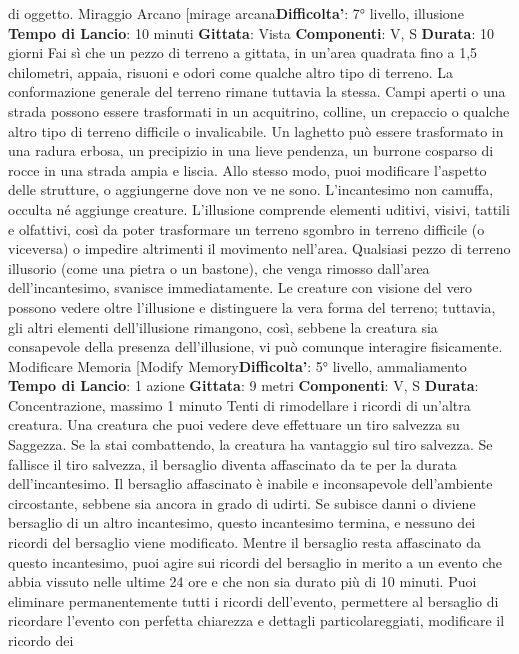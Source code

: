 \begin{multicols}{2}
di oggetto.
Miraggio Arcano
[mirage arcana\textbf{Difficolta'}:
7° livello, illusione
\textbf{Tempo di Lancio}: 10 minuti
\textbf{Gittata}: Vista
\textbf{Componenti}: V, S
\textbf{Durata}: 10 giorni
Fai sì che un pezzo di terreno a gittata, in un’area
quadrata fino a 1,5 chilometri, appaia, risuoni e odori
come qualche altro tipo di terreno. La conformazione
generale del terreno rimane tuttavia la stessa. Campi
aperti o una strada possono essere trasformati in un
acquitrino, colline, un crepaccio o qualche altro tipo di
terreno difficile o invalicabile. Un laghetto può essere
trasformato in una radura erbosa, un precipizio in una
lieve pendenza, un burrone cosparso di rocce in una
strada ampia e liscia.
Allo stesso modo, puoi modificare l’aspetto delle
strutture, o aggiungerne dove non ve ne sono.
L’incantesimo non camuffa, occulta né aggiunge
creature.
L’illusione comprende elementi uditivi, visivi, tattili e
olfattivi, così da poter trasformare un terreno sgombro
in terreno difficile (o viceversa) o impedire altrimenti il
movimento nell’area. Qualsiasi pezzo di terreno illusorio
(come una pietra o un bastone), che venga rimosso
dall’area dell’incantesimo, svanisce immediatamente.
Le creature con visione del vero possono vedere oltre
l’illusione e distinguere la vera forma del terreno;
tuttavia, gli altri elementi dell’illusione rimangono, così,
sebbene la creatura sia consapevole della presenza
dell’illusione, vi può comunque interagire fisicamente.
Modificare Memoria
[Modify Memory\textbf{Difficolta'}:
5° livello, ammaliamento
\textbf{Tempo di Lancio}: 1 azione
\textbf{Gittata}: 9 metri
\textbf{Componenti}: V, S
\textbf{Durata}: Concentrazione, massimo 1 minuto
Tenti di rimodellare i ricordi di un’altra creatura. Una
creatura che puoi vedere deve effettuare un tiro
salvezza su Saggezza. Se la stai combattendo, la
creatura ha vantaggio sul tiro salvezza. Se fallisce il tiro
salvezza, il bersaglio diventa affascinato da te per la
durata dell’incantesimo. Il bersaglio affascinato è inabile
e inconsapevole dell’ambiente circostante, sebbene sia
ancora in grado di udirti. Se subisce danni o diviene
bersaglio di un altro incantesimo, questo incantesimo 
termina, e nessuno dei ricordi del bersaglio viene
modificato.
Mentre il bersaglio resta affascinato da questo
incantesimo, puoi agire sui ricordi del bersaglio in
merito a un evento che abbia vissuto nelle ultime 24 ore
e che non sia durato più di 10 minuti. Puoi eliminare
permanentemente tutti i ricordi dell’evento, permettere
al bersaglio di ricordare l’evento con perfetta chiarezza
e dettagli particolareggiati, modificare il ricordo dei

\end{multicols}
